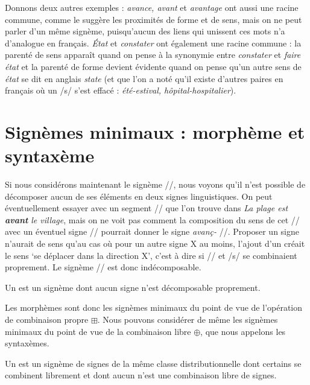 {    Donnons deux autres exemples : \textit{avance, avant} et \textit{avantage} ont aussi une racine commune, comme le suggère les proximités de forme et de sens, mais on ne peut parler d’un même signème, puisqu’aucun des liens qui unissent ces mots n’a d’analogue en français. \textit{État} et \textit{constater} ont également une racine commune : la parenté de sens apparaît quand on pense à la synonymie entre \textit{constater} et \textit{faire état} et la parenté de forme devient évidente quand on pense qu’un autre sens de \textit{état} se dit en anglais \textit{state} (et que l’on a noté qu’il existe d’autres paires en français où un /s/ s’est effacé : \textit{été-estival, hôpital-hospitalier}).
}
\section{Signèmes minimaux : morphème et syntaxème}\label{sec:2.2.11}%

Si nous considérons maintenant le signème //, nous voyons qu’il n’est possible de décomposer aucun de ses éléments en deux signes linguistiques. On peut éventuellement essayer avec un segment // que l’on trouve dans \textit{La plage est} \textbf{\textit{avant}} \textit{le village}, mais on ne voit pas comment la composition du sens de cet // avec un éventuel signe // pourrait donner le signe \textit{avanç-} //. Proposer un signe  n’aurait de sens qu’au cas où pour un autre signe X au moins, l’ajout d’un  créait le sens ‘se déplacer dans la direction X’, c’est à dire si // et /s/ se combinaient proprement. Le signème // est donc indécomposable.

{Un  est un signème dont aucun signe n’est décomposable proprement.}

Les morphèmes sont donc les signèmes minimaux du point de vue de l’opération de combinaison propre ${\boxplus}$. Nous pouvons considérer de même les signèmes minimaux du point de vue de la combinaison libre ${\oplus}$, que nous appelons les syntaxèmes.

{Un  est un signème de signes de la même classe distributionnelle dont certains se combinent librement et dont aucun n’est une combinaison libre de signes.}

